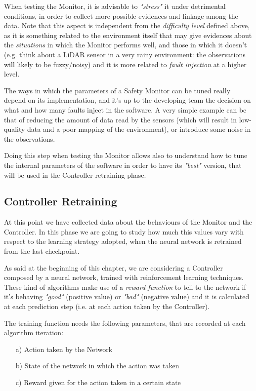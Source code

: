 When testing the Monitor, it is advisable to \textsl{"stress"} it under detrimental conditions, in order to collect more possible evidences and linkage among the data. Note that this aspect is independent from the \textsl{difficulty level} defined above, as it is something related to the environment itself that may give evidences about the \textsl{situations} in which the Monitor performs well, and those in which it doesn't (e.g. think about a LiDAR sensor in a very rainy environment: the observations will likely to be fuzzy/noisy) and it is more related to \textsl{fault injection} at a higher level.

The ways in which the parameters of a Safety Monitor can be tuned really depend on its implementation, and it's up to the developing team the decision on what and how many faults inject in the software. A very simple example can be that of reducing the amount of data read by the sensors (which will result in low-quality data and a poor mapping of the environment), or introduce some noise in the observations.

Doing this step when testing the Monitor allows also to understand how to tune the internal parameters of the software in order to have its \textsl{"best"} version, that will be used in the Controller retraining phase.

\subsection{Controller Retraining}

At this point we have collected data about the behaviours of the Monitor and the Controller. In this phase we are going to study how much this values vary with respect to the learning strategy adopted, when the neural network is retrained from the last checkpoint.

As said at the beginning of this chapter, we are considering a Controller composed by a neural network, trained with reinforcement learning techniques. These kind of algorithms make use of a \textsl{reward function} to tell to the network if it's behaving \textsl{"good"} (positive value) or \textsl{"bad"} (negative value) and it is calculated at each prediction step (i.e. at each action taken by the Controller).\newline

The training function needs the following parameters, that are recorded at each algorithm iteration:

\begin{itemize}
	\item[a)] Action taken by the Network
	\item[b)] State of the network in which the action was taken
	\item[c)] Reward given for the action taken in a certain state
\end{itemize}

